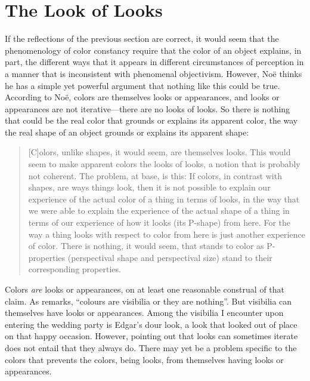 \documentclass[12pt]{article}
\begin{document}

\section{The Look of Looks} %
\label{sec:the_look_of_looks}

If the reflections of the previous section are correct, it would seem that the phenomenology of color constancy require that the color of an object explains, in part, the different ways that it appears in different circumstances of perception in a manner that is inconsistent with phenomenal objectivism. However, Noë thinks he has a simple yet powerful argument that nothing like this could be true. According to Noë, colors are themselves looks or appearances, and looks or appearances are not iterative---there are no looks of looks. So there is nothing that could be the real color that grounds or explains its apparent color, the way the real shape of an object grounds or explains its apparent shape:
	\begin{quote}
		[C]olors, unlike shapes, it would seem, are themselves looks. This would seem to make apparent colors the looks of looks, a notion that is probably not coherent. The problem, at base, is this: If colors, in contrast with shapes, are ways things look, then it is not possible to explain our experience of the actual color of a thing in terms of looks, in the way that we were able to explain the experience of the actual shape of a thing in terms of our experience of how it looks (its P-shape) from here. For the way a thing looks with respect to color from here is just another experience of color. There is nothing, it would seem, that stands to color as P-properties (perspectival shape and perspectival size) stand to their corresponding properties. \citep[133]{Noe:2004fk}
	\end{quote}

Colors \emph{are} looks or appearances, on at least one reasonable construal of that claim. As \citet[109]{Strawson:1966kx} remarks, ``colours are visibilia or they are nothing''. But visibilia can themselves have looks or appearances. Among the visibilia I encounter upon entering the wedding party is Edgar's dour look, a look that looked out of place on that happy occasion. However, pointing out that looks can sometimes iterate does not entail that they always do. There may yet be a problem specific to the colors that prevents the colors, being looks, from themselves having looks or appearances.
\end{document}
